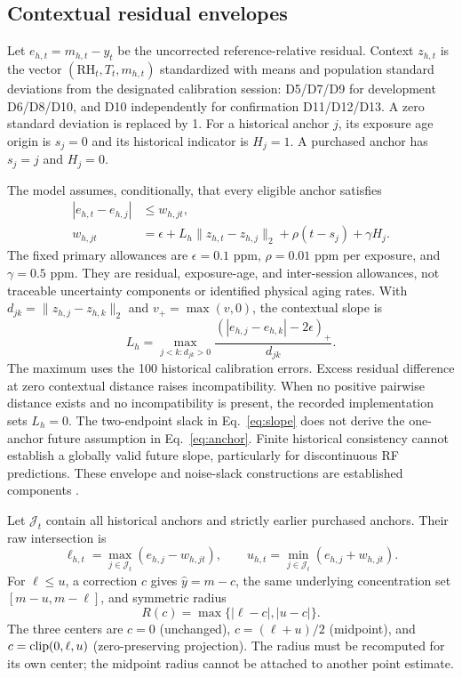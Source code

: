 \subsection{Contextual residual envelopes}\label{sec:envelopes}
Let $e_{h,t}=m_{h,t}-y_t$ be the uncorrected reference-relative residual. Context $z_{h,t}$ is the vector $(\mathrm{RH}_t,T_t,m_{h,t})$ standardized with means and population standard deviations from the designated calibration session: D5/D7/D9 for development D6/D8/D10, and D10 independently for confirmation D11/D12/D13. A zero standard deviation is replaced by 1. For a historical anchor $j$, its exposure age origin is $s_j=0$ and its historical indicator is $H_j=1$. A purchased anchor has $s_j=j$ and $H_j=0$.

The model assumes, conditionally, that every eligible anchor satisfies
\begin{align}
|e_{h,t}-e_{h,j}|&\leq w_{h,jt},\label{eq:anchor}\\
w_{h,jt}&=\epsilon+L_h\|z_{h,t}-z_{h,j}\|_2+
\rho(t-s_j)+\gamma H_j.
\label{eq:w}
\end{align}
The fixed primary allowances are $\epsilon=0.1$ ppm, $\rho=0.01$ ppm per exposure, and $\gamma=0.5$ ppm. They are residual, exposure-age, and inter-session allowances, not traceable uncertainty components or identified physical aging rates. With $d_{jk}=\|z_{h,j}-z_{h,k}\|_2$ and $v_+=\max(v,0)$, the contextual slope is
\begin{equation}
L_h=\max_{j<k:d_{jk}>0}
\frac{(|e_{h,j}-e_{h,k}|-2\epsilon)_+}{d_{jk}}.
\label{eq:slope}
\end{equation}
The maximum uses the 100 historical calibration errors. Excess residual difference at zero contextual distance raises incompatibility. When no positive pairwise distance exists and no incompatibility is present, the recorded implementation sets $L_h=0$. The two-endpoint slack in Eq.~\eqref{eq:slope} does not derive the one-anchor future assumption in Eq.~\eqref{eq:anchor}. Finite historical consistency cannot establish a globally valid future slope, particularly for discontinuous RF predictions. These envelope and noise-slack constructions are established components \cite{calliess2017,walter1990}.

Let $\mathcal J_t$ contain all historical anchors and strictly earlier purchased anchors. Their raw intersection is
\begin{equation}
\ell_{h,t}=\max_{j\in\mathcal J_t}(e_{h,j}-w_{h,jt}),\qquad
u_{h,t}=\min_{j\in\mathcal J_t}(e_{h,j}+w_{h,jt}).
\label{eq:intersection}
\end{equation}
For $\ell\leq u$, a correction $c$ gives $\widehat y=m-c$, the same underlying concentration set $[m-u,m-\ell]$, and symmetric radius
\begin{equation}
R(c)=\max\{|\ell-c|,|u-c|\}.
\label{eq:radius}
\end{equation}
The three centers are $c=0$ (unchanged), $c=(\ell+u)/2$ (midpoint), and $c=\operatorname{clip}(0,\ell,u)$ (zero-preserving projection). The radius must be recomputed for its own center; the midpoint radius cannot be attached to another point estimate.

